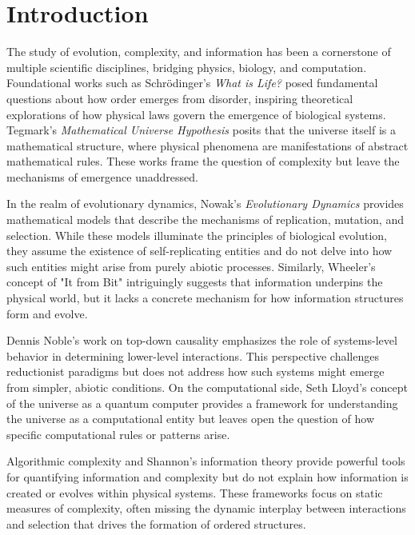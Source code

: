 \documentclass[entropy,article,submit,pdftex,moreauthors]{Definitions/mdpi}
\begin{document}


\section{Introduction}

The study of evolution, complexity, and information has been a cornerstone of multiple scientific disciplines, bridging physics, biology, and computation. Foundational works such as Schrödinger's \textit{What is Life?} \cite{schrodinger1944life} posed fundamental questions about how order emerges from disorder, inspiring theoretical explorations of how physical laws govern the emergence of biological systems. Tegmark's \textit{Mathematical Universe Hypothesis} \cite{tegmark2008mathematical} posits that the universe itself is a mathematical structure, where physical phenomena are manifestations of abstract mathematical rules. These works frame the question of complexity but leave the mechanisms of emergence unaddressed.

In the realm of evolutionary dynamics, Nowak's \textit{Evolutionary Dynamics} \cite{nowak2006evolutionary} provides mathematical models that describe the mechanisms of replication, mutation, and selection. While these models illuminate the principles of biological evolution, they assume the existence of self-replicating entities and do not delve into how such entities might arise from purely abiotic processes. Similarly, Wheeler's concept of "It from Bit" \cite{wheeler1990itbit} intriguingly suggests that information underpins the physical world, but it lacks a concrete mechanism for how information structures form and evolve.

Dennis Noble's work on top-down causality \cite{noble2012causality} emphasizes the role of systems-level behavior in determining lower-level interactions. This perspective challenges reductionist paradigms but does not address how such systems might emerge from simpler, abiotic conditions. On the computational side, Seth Lloyd’s concept of the universe as a quantum computer \cite{lloyd2006programming} provides a framework for understanding the universe as a computational entity but leaves open the question of how specific computational rules or patterns arise.

Algorithmic complexity \cite{kolmogorov1965complexity} \cite{chaitin1977algorithmic} \cite{solomonoff1964formal} and Shannon’s information theory \cite{shannon1948mathematical} provide powerful tools for quantifying information and complexity but do not explain how information is created or evolves within physical systems. These frameworks focus on static measures of complexity, often missing the dynamic interplay between interactions and selection that drives the formation of ordered structures.
\end{document}
